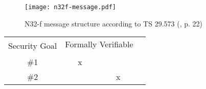 \begin{figure}[h!]
    \centering
    \texttt{[image: n32f-message.pdf]}
    \caption{N32-f message structure according to TS 29.573 (\cite{3gpp.29.573}, p. 22)}
    \label{fig:n32f-message}
\end{figure}


\begin{table}
    \centering
    \begin{tabular}{|l|c|cc} 
    \cline{1-3}
    \multirow{2}{*}{ Security Goal} & \multicolumn{2}{m{4cm}|}{ Formally Verifiable} &   \\ 
    \cline{2-3}
                                    & \multicolumn{1}{m{2cm}|}{\centering{Yes}} & \multicolumn{1}{m{2cm}|}{\centering{No}}             &   \\ 
    \cline{1-3}
    \multicolumn{1}{c|}{\#1}        & x   &                                     &   \\
    \multicolumn{1}{c|}{\#2}        &     & x                                   &  
    \end{tabular}
\end{table}